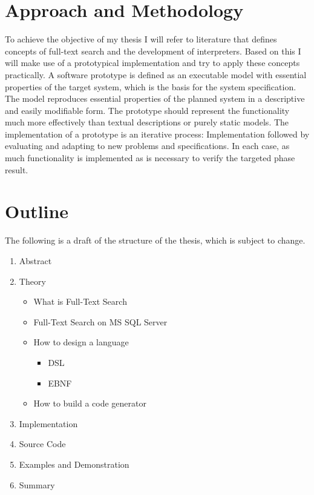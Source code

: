 \section{Approach and Methodology}
To achieve the objective of my thesis I will refer to literature that defines concepts of full-text search and the development of interpreters. Based on this I will make use of a prototypical implementation and try to apply these concepts practically. A software prototype is defined as an executable model with essential properties of the target system, which is the basis for the system specification. The model reproduces essential properties of the planned system in a descriptive and easily modifiable form. The prototype should represent the functionality much more effectively than textual descriptions or purely static models. \parencite[cf.][]{connell_structured_1989} The implementation of a prototype is an iterative process: Implementation followed by evaluating and adapting to new problems and specifications. In each case, as much functionality is implemented as is necessary to verify the targeted phase result. \parencite[cf.][p. 3]{pomberger_methoden_1992}
\newpage
\section{Outline}
The following is a draft of the structure of the thesis, which is subject to change.
\begin{enumerate}[noitemsep]
    \item Abstract
    \item Theory
    \begin{itemize}[noitemsep]
        \item What is Full-Text Search
        \item Full-Text Search on MS SQL Server
        \item How to design a language
        \begin{itemize}[noitemsep]
            \item DSL
            \item EBNF
        \end{itemize}
        \item How to build a code generator
    \end{itemize}
    \item Implementation
    \item Source Code
    \item Examples and Demonstration
    \item Summary
\end{enumerate}
\newpage
